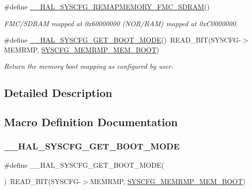 \begin{DoxyCompactItemize}
\#define \mbox{\hyperlink{group___h_a_l___exported___macros_ga9289478fb2dc47d4cce6e0c956b4dafd}{\+\_\+\+\_\+\+H\+A\+L\+\_\+\+S\+Y\+S\+C\+F\+G\+\_\+\+R\+E\+M\+A\+P\+M\+E\+M\+O\+R\+Y\+\_\+\+F\+M\+C\+\_\+\+S\+D\+R\+AM}}()
\begin{DoxyCompactList}\small\item\em F\+M\+C/\+S\+D\+R\+AM mapped at 0x60000000 (N\+O\+R/\+R\+AM) mapped at 0x\+C0000000. \end{DoxyCompactList}\item 
\#define \mbox{\hyperlink{group___h_a_l___exported___macros_ga0e71eb2b553f1a7b8172710184a89caa}{\+\_\+\+\_\+\+H\+A\+L\+\_\+\+S\+Y\+S\+C\+F\+G\+\_\+\+G\+E\+T\+\_\+\+B\+O\+O\+T\+\_\+\+M\+O\+DE}}()~R\+E\+A\+D\+\_\+\+B\+IT(S\+Y\+S\+C\+FG-\/$>$M\+E\+M\+R\+MP, \mbox{\hyperlink{group___peripheral___registers___bits___definition_ga2efc5ebe6f79c27456ab4c7f5d0c8066}{S\+Y\+S\+C\+F\+G\+\_\+\+M\+E\+M\+R\+M\+P\+\_\+\+M\+E\+M\+\_\+\+B\+O\+OT}})
\begin{DoxyCompactList}\small\item\em Return the memory boot mapping as configured by user. \end{DoxyCompactList}\end{DoxyCompactItemize}


\subsection{Detailed Description}


\subsection{Macro Definition Documentation}
\mbox{\label{group___h_a_l___exported___macros_ga0e71eb2b553f1a7b8172710184a89caa}} 
\subsubsection{\texorpdfstring{\_\_HAL\_SYSCFG\_GET\_BOOT\_MODE}{\_\_HAL\_SYSCFG\_GET\_BOOT\_MODE}}
{\footnotesize\ttfamily \#define \+\_\+\+\_\+\+H\+A\+L\+\_\+\+S\+Y\+S\+C\+F\+G\+\_\+\+G\+E\+T\+\_\+\+B\+O\+O\+T\+\_\+\+M\+O\+DE(\begin{DoxyParamCaption}{ }\end{DoxyParamCaption})~R\+E\+A\+D\+\_\+\+B\+IT(S\+Y\+S\+C\+FG-\/$>$M\+E\+M\+R\+MP, \mbox{\hyperlink{group___peripheral___registers___bits___definition_ga2efc5ebe6f79c27456ab4c7f5d0c8066}{S\+Y\+S\+C\+F\+G\+\_\+\+M\+E\+M\+R\+M\+P\+\_\+\+M\+E\+M\+\_\+\+B\+O\+OT}})}




